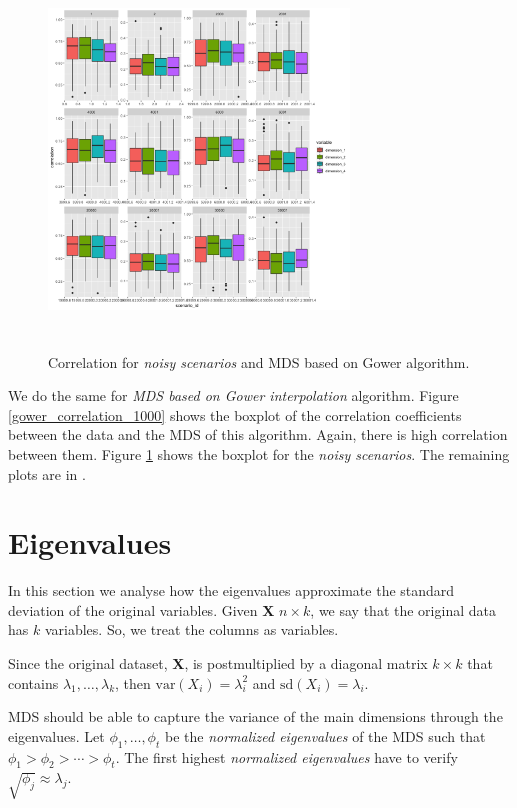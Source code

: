 \documentclass[11pt]{report}
\begin{document}
\begin{figure}[!ht]
\centering
    \includegraphics[width=8cm, height=10cm]{./images/gower_correlation_noise.png}
    \caption{Correlation for \textit{noisy scenarios} and MDS based on Gower algorithm.}
    \label{gower_correlation_noise}
\end{figure}


We do the same for \textit{MDS based on Gower interpolation} algorithm. 
Figure \ref{gower_correlation_1000} shows the boxplot of the correlation 
coefficients between the data and the MDS of this algorithm. Again, there is 
high correlation between them. Figure \ref{gower_correlation_noise} shows the 
boxplot for the \textit{noisy scenarios}. The remaining plots are in 
.

\FloatBarrier
\section{Eigenvalues}
In this section we analyse how the eigenvalues approximate the standard 
deviation of the original variables. Given \textbf{X} $n \times k$, we say 
that the original data has $k$ variables. So, we treat the columns as 
variables. 

\indent Since the original dataset, \textbf{X}, is postmultiplied by a diagonal 
matrix $k \times k$ that contains $\lambda_1, \dots, \lambda_k$, then 
$\mbox{var}(X_i) = \lambda_i^2$ and $\mbox{sd}(X_i) = \lambda_i$. 

\indent MDS should be able to capture the variance of the main dimensions 
through the eigenvalues. Let $\phi_1, \dots, \phi_t$ be the 
\textit{normalized eigenvalues} of the MDS such that 
$\phi_1 > \phi_2 > \cdots > \phi_t$. The first highest
\textit{normalized eigenvalues} have to verify $\sqrt{\phi_j} \approx \lambda_j$.
\end{document}
